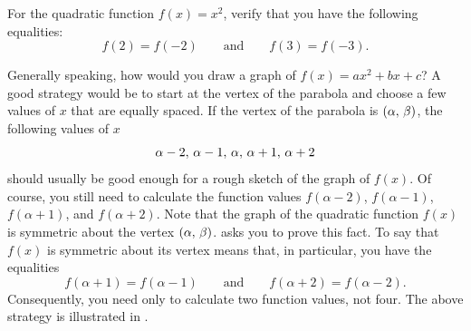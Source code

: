 \documentclass[a4paper,oneside,12pt]{article}
\begin{document}
\begin{exercise}
For the quadratic function $f(x) = x^2$, verify that you have the
following equalities:
\[
f(2) = f(-2)
\qquad
\text{and}
\qquad
f(3) = f(-3).
\]
\end{exercise}

Generally speaking, how would you draw a graph of
$f(x) = ax^2 + bx + c$?  A good strategy would be to start at the
vertex of the parabola and choose a few values of $x$ that are equally
spaced.  If the vertex of the parabola is $\left\lparen{\alpha},\, {\beta}\right\rparen$, the
following values of $x$
\[
{\alpha-2},\, {\alpha-1},\, {\alpha},\, {\alpha+1},\, {\alpha+2}
\]
should usually be good enough for a rough sketch of the graph of
$f(x)$.  Of course, you still need to calculate the function values
$f(\alpha-2)$, $f(\alpha-1)$, $f(\alpha+1)$, and $f(\alpha+2)$.  Note
that the graph of the quadratic function $f(x)$ is symmetric about the
vertex $\left\lparen{\alpha},\, {\beta}\right\rparen$.
 asks you to prove this
fact.  To say that $f(x)$ is symmetric about its vertex means that, in
particular, you have the equalities
\[
f(\alpha+1) = f(\alpha-1)
\qquad
\text{and}
\qquad
f(\alpha+2) = f(\alpha-2).
\]
Consequently, you need only to calculate two function values, not
four.  The above strategy is illustrated in
.
\end{document}
